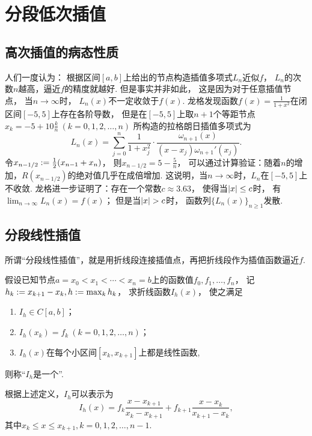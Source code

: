 \section{分段低次插值}
\subsection{高次插值的病态性质}
人们一度认为：
根据区间\([a,b]\)上给出的节点构造插值多项式\(L_n\)近似\(f\)，
\(L_n\)的次数\(n\)越高，逼近\(f\)的精度就越好.
但是事实并非如此，
这是因为对于任意插值节点，
当\(n\to\infty\)时，
\(L_n(x)\)不一定收敛于\(f(x)\).
龙格发现函数\(f(x) = \frac1{1+x^2}\)在闭区间\([-5,5]\)上存在各阶导数，
但是在\([-5,5]\)上取\(n+1\)个等距节点\(x_k = -5 + 10 \frac{k}{n}\ (k=0,1,2,\dotsc,n)\)
所构造的拉格朗日插值多项式为\begin{equation*}
	L_n(x)
	= \sum_{j=0}^n \frac{1}{1+x_j^2} \cdot \frac{\omega_{n+1}(x)}{(x - x_j) \omega_{n+1}'(x_j)}.
\end{equation*}
令\(x_{n-1/2} := \frac12 (x_{n-1} + x_n)\)，
则\(x_{n-1/2} = 5 - \frac5n\)，
可以通过计算验证：随着\(n\)的增加，\(R(x_{n-1/2})\)的绝对值几乎在成倍增加.
这说明，当\(n\to\infty\)时，\(L_n\)在\([-5,5]\)上不收敛.
龙格进一步证明了：存在一个常数\(c \approx 3.63\)，
使得当\(\abs{x} \leq c\)时，
有\(\lim_{n\to\infty} L_n(x) = f(x)\)；
但是当\(\abs{x} > c\)时，
函数列\(\{L_n(x)\}_{n\geq1}\)发散.

\subsection{分段线性插值}
所谓“分段线性插值”，就是用折线段连接插值点，再把折线段作为插值函数逼近\(f\).

假设已知节点\(a = x_0 < x_1 < \dotsb < x_n = b\)上的函数值\(f_0,f_1,\dotsc,f_n\)，
记\(
	h_k := x_{k+1} - x_k,
	h := \max_k h_k
\)，
求折线函数\(I_h(x)\)，
使之满足\begin{enumerate}
	\item \(I_h \in C[a,b]\)；
	\item \(I_h(x_k) = f_k\ (k=0,1,2,\dotsc,n)\)；
	\item \(I_h(x)\)在每个小区间\([x_k,x_{k+1}]\)上都是线性函数,
\end{enumerate}
则称“\(I_h\)是一个”.

根据上述定义，\(I_h\)可以表示为\begin{equation}
	I_h(x)
	= f_k \frac{x - x_{k+1}}{x_k - x_{k+1}}
	+ f_{k+1} \frac{x - x_k}{x_{k+1} - x_k},
\end{equation}
其中\(
	x_k \leq x \leq x_{k+1},
	k=0,1,2,\dotsc,n-1
\).


